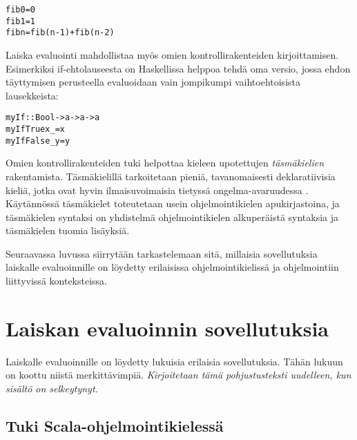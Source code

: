 \begin{alltt}
fib 0 = 0
fib 1 = 1
fib n = fib (n-1) + fib (n-2)
\end{alltt}

Laiska evaluointi mahdollistaa myös omien kontrollirakenteiden kirjoittamisen. Esimerkiksi if-ehtolauseesta on Haskellissa helppoa tehdä oma versio, jossa ehdon täyttymisen perusteella evaluoidaan vain jompikumpi vaihtoehtoisista lausekkeista:

\begin{alltt}
% Käyttö: myIf condition onTrue onFalse
myIf :: Bool -> a -> a -> a
myIf True  x _ = x
myIf False _ y = y
\end{alltt}

Omien kontrollirakenteiden tuki helpottaa kieleen upotettujen \textit{täsmäkielien} rakentamista. Täsmäkielillä tarkoitetaan pieniä, tavanomaisesti deklaratiivisia kieliä, jotka ovat hyvin ilmaisuvoimaisia tietyssä ongelma-avaruudessa \citep{van2000domain}. Käytännössä täsmäkielet toteutetaan usein ohjelmointikielen apukirjastoina, ja täsmäkielen syntaksi on yhdistelmä ohjelmointikielen alkuperäistä syntaksia ja täsmäkielen tuomia lisäyksiä.

Seuraavassa luvussa siirrytään tarkastelemaan sitä, millaisia sovellutuksia laiskalle evaluoinnille on löydetty erilaisissa ohjelmointikielissä ja ohjelmointiin liittyvissä \mbox{konteksteissa.}


\section{Laiskan evaluoinnin sovellutuksia}


Laiskalle evaluoinnille on löydetty lukuisia erilaisia sovellutuksia. Tähän lukuun on koottu niistä merkittävimpiä. \textit{Kirjoitetaan tämä pohjustusteksti uudelleen, kun sisältö on selkeytynyt.}

\subsection{Tuki Scala-ohjelmointikielessä}

